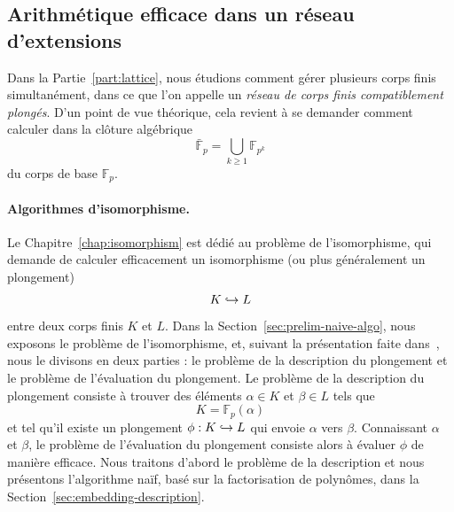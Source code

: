 \subsection*{Arithmétique efficace dans un réseau d'extensions}

Dans la Partie~\ref{part:lattice}, nous étudions comment gérer plusieurs
corps finis simultanément, dans ce que l'on appelle un \emph{réseau de corps
finis compatiblement plongés}. D'un point de vue théorique, cela revient à se
demander comment calculer dans la clôture algébrique
\[
  \bar{\mathbb{F}}_{p} = \bigcup_{k\geq1}\mathbb{F}_{p^k}
\]
du corps de base $\mathbb{F}_p$.

\paragraph{Algorithmes d'isomorphisme.} Le Chapitre~\ref{chap:isomorphism} est
dédié au problème de l'isomorphisme, qui demande de calculer efficacement un
isomorphisme (ou plus généralement un plongement)
\[
  K\hookrightarrow L
\]
entre deux corps finis $K$ et $L$. Dans la Section~\ref{sec:prelim-naive-algo},
nous exposons le problème de l'isomorphisme, et, suivant la présentation faite
dans~\cite{BDDFS17}, nous le divisons en deux parties : le problème de la
description du plongement et le problème de l'évaluation du plongement. Le
problème de la description du plongement consiste à trouver des éléments
$\alpha\in K$ et $\beta\in L$ tels que
\[
  K = \mathbb{F}_{p}(\alpha)
\]
et tel qu'il existe un plongement $\phi:K\hookrightarrow L$ qui envoie $\alpha$ vers
$\beta$. Connaissant $\alpha$ et $\beta$, le problème de l'évaluation du
plongement consiste alors à évaluer $\phi$ de manière efficace. Nous traitons
d'abord le problème de la description et nous présentons l'algorithme naïf, basé
sur la factorisation de polynômes, dans la
Section~\ref{sec:embedding-description}.

